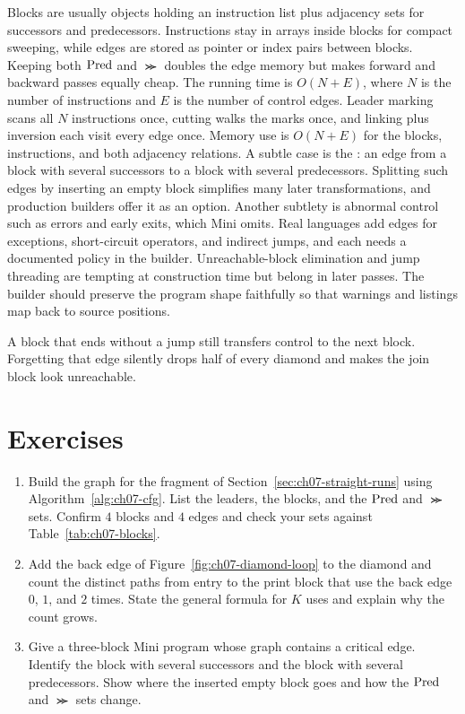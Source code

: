 Blocks are usually objects holding an instruction list plus adjacency sets for successors and predecessors.
Instructions stay in arrays inside blocks for compact sweeping, while edges are stored as pointer or index pairs between blocks.
Keeping both $\operatorname{Pred}$ and $\Succ$ doubles the edge memory but makes forward and backward passes equally cheap.
The running time is $O(N + E)$, where $N$ is the number of instructions and $E$ is the number of control edges.
Leader marking scans all $N$ instructions once, cutting walks the marks once, and linking plus inversion each visit every edge once.
Memory use is $O(N + E)$ for the blocks, instructions, and both adjacency relations.
A subtle case is the : an edge from a block with several successors to a block with several predecessors.
Splitting such edges by inserting an empty block simplifies many later transformations, and production builders offer it as an option.
Another subtlety is abnormal control such as errors and early exits, which Mini omits.
Real languages add edges for exceptions, short-circuit operators, and indirect jumps, and each needs a documented policy in the builder.
Unreachable-block elimination and jump threading are tempting at construction time but belong in later passes.
The builder should preserve the program shape faithfully so that warnings and listings map back to source positions.
\begin{ccnote}
A block that ends without a jump still transfers control to the next block.
Forgetting that edge silently drops half of every diamond and makes the join block look unreachable.
\end{ccnote}

\section{Exercises}
\label{sec:ch07-exercises}

\begin{enumerate}
\item \label{ex:ch07-build-diamond} Build the graph for the fragment of Section~\ref{sec:ch07-straight-runs} using Algorithm~\ref{alg:ch07-cfg}. List the leaders, the blocks, and the $\operatorname{Pred}$ and $\Succ$ sets. Confirm $4$ blocks and $4$ edges and check your sets against Table~\ref{tab:ch07-blocks}.
\item \label{ex:ch07-count-paths} Add the back edge of Figure~\ref{fig:ch07-diamond-loop} to the diamond and count the distinct paths from entry to the print block that use the back edge $0$, $1$, and $2$ times. State the general formula for $K$ uses and explain why the count grows.
\item \label{ex:ch07-critical} Give a three-block Mini program whose graph contains a critical edge. Identify the block with several successors and the block with several predecessors. Show where the inserted empty block goes and how the $\operatorname{Pred}$ and $\Succ$ sets change.
\end{enumerate}

